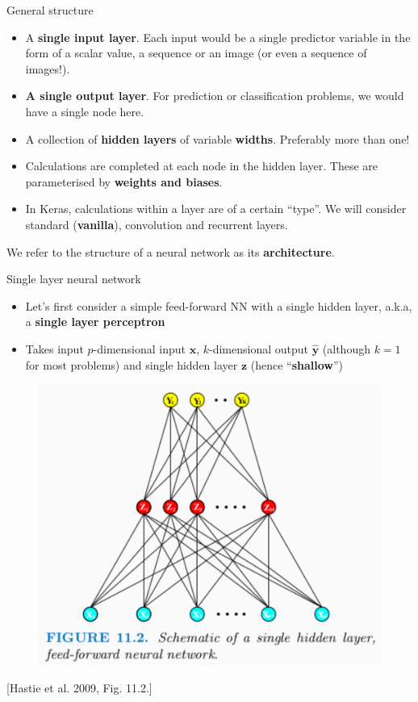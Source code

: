 \documentclass{beamer}
\begin{document}
\begin{frame}{General structure}
\begin{itemize}
\item A \textbf{single input layer}. Each input would be a single predictor variable in the form of a scalar value, a sequence or an image (or even a sequence of images!).
\item \textbf{A single output layer}. For prediction or classification problems, we would have a single node here. 
\item A collection of \textbf{hidden layers} of variable \textbf{widths}. Preferably more than one!
\item Calculations are completed at each node in the hidden layer. These are parameterised by \textbf{weights and biases}.
\item In Keras, calculations within a layer are of a certain ``type''. We will consider standard (\textbf{vanilla}), convolution and recurrent layers.
\end{itemize}
We refer to the structure of a neural network as its \textbf{architecture}.
\end{frame}
\begin{frame}{Single layer neural network}
\begin{itemize}
\item Let's first consider a simple feed-forward NN with a single hidden layer, a.k.a, a \textbf{single layer perceptron}
\item Takes input $p$-dimensional input $\mathbf{x}$, $k$-dimensional output $\hat{\mathbf{y}}$ (although $k=1$ for most problems) and single hidden layer $\mathbf{z}$ (hence ``\textbf{shallow}'')
\end{itemize}
\begin{figure}
\includegraphics[width=0.48\linewidth]{Images/singleNN.png}
\end{figure}
[Hastie et al. 2009, Fig. 11.2.]
\end{frame}
\end{document}
